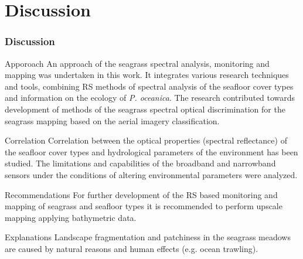 \documentclass[pdflatex,compress,9pt,
	xcolor={dvipsnames,dvipsnames,svgnames,x11names,table},
	hyperref={colorlinks = true,breaklinks = true, urlcolor = NavyBlue, breaklinks = true}]{beamer}
\begin{document}
\section{Discussion}
\begin{frame}\frametitle{Discussion}

\begin{alertblock}{Apporoach}
An approach of the seagrass spectral analysis, monitoring and mapping was undertaken in this work. It integrates various research techniques and tools, combining \ac{RS} methods of spectral analysis of the seafloor cover types and information on the ecology of \emph{P. oceanica}. The research contributed towards development of methods of the seagrass spectral optical discrimination for the seagrass mapping based on the aerial imagery classification.
\end{alertblock}

\begin{block}{Correlation}
Correlation between the optical properties (spectral reflectance) of the seafloor cover types and hydrological parameters of the environment has been studied. The limitations and capabilities of the broadband and narrowband sensors under the conditions of altering environmental parameters were analyzed.
\end{block}

\begin{alertblock}{Recommendations}
For further development of the \ac{RS} based monitoring and mapping of seagrass and seafloor types it is recommended to perform upscale mapping applying bathymetric data.
\end{alertblock}

\begin{block}{Explanations}
Landscape fragmentation and patchiness in the seagrass meadows are caused by natural reasons and human effects (e.g. ocean trawling).
\end{block} 

\end{frame}
\end{document}
